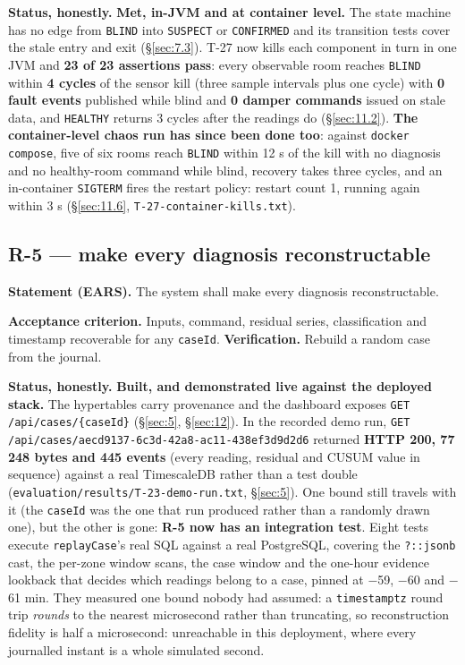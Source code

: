 \textbf{Status, honestly.} \textbf{Met, in-JVM and at container level.} The state machine has no
edge from \texttt{BLIND} into \texttt{SUSPECT} or \texttt{CONFIRMED} and its transition tests
cover the stale entry and exit (§\ref{sec:7.3}). T-27 now kills each component in turn in one JVM and
\textbf{23 of 23 assertions pass}: every observable room reaches \texttt{BLIND} within
\textbf{4 cycles} of the sensor kill (three sample intervals plus one cycle) with
\textbf{0 fault events} published while blind and \textbf{0 damper commands} issued on stale data,
and \texttt{HEALTHY} returns 3 cycles after the readings do (§\ref{sec:11.2}). \textbf{The container-level
chaos run has since been done too}: against \texttt{docker compose}, five of six rooms reach
\texttt{BLIND} within 12 s of the kill with no diagnosis and no healthy-room command while blind,
recovery takes three cycles, and an in-container \texttt{SIGTERM} fires the restart policy: restart
count 1, running again within 3 s (§\ref{sec:11.6}, \texttt{T-27-container-kills.txt}).

\subsection{R-5 --- make every diagnosis reconstructable}\label{sec:A.5}

\textbf{Statement (EARS).} The system shall make every diagnosis reconstructable.

\textbf{Acceptance criterion.} Inputs, command, residual series,
classification and timestamp recoverable for any \texttt{caseId}. \quad \textbf{Verification.} Rebuild a random case from
the journal.

\textbf{Status, honestly.} \textbf{Built, and demonstrated live against the deployed stack.} The hypertables
carry provenance and the dashboard exposes \texttt{GET /api/cases/\{caseId\}} (§\ref{sec:5}, §\ref{sec:12}). In the
recorded demo run, \texttt{GET /api/cases/aecd9137-\allowbreak 6c3d-\allowbreak 42a8-\allowbreak ac11-\allowbreak 438ef3d9d2d6} returned
\textbf{HTTP 200, 77\,248 bytes and 445 events} (every reading, residual and CUSUM value in
sequence) against a real TimescaleDB rather than a test double
(\texttt{evaluation/results/T-23-demo-run.txt}, §\ref{sec:5}). One bound still travels with it (the
\texttt{caseId} was the one that run produced rather than a randomly drawn one), but the other is
gone: \textbf{R-5 now has an integration test}. Eight tests execute \texttt{replayCase}'s real SQL
against a real PostgreSQL, covering the \texttt{?::jsonb} cast, the per-zone window scans, the case
window and the one-hour evidence lookback that decides which readings belong to a case, pinned at
$-$59, $-$60 and $-$61 min. They measured one bound nobody had assumed: a \texttt{timestamptz} round
trip \emph{rounds} to the nearest microsecond rather than truncating, so reconstruction fidelity is
half a microsecond: unreachable in this deployment, where every journalled instant is a whole
simulated second.

